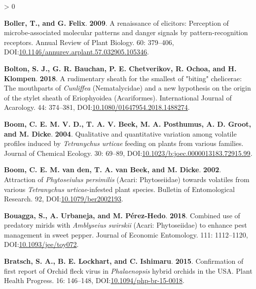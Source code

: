 \documentclass{ufdissertation}[overrideChapters] %
\newlength{\cslhangindent}
\newenvironment{CSLReferences}[2] %
 {%
  \setlength{\parindent}{0pt}
  \ifodd #1 \everypar{\setlength{\hangindent}{\cslhangindent}}\ignorespaces\fi
  \ifnum #2 > 0
  \setlength{\parskip}{#2\baselineskip}
  \fi
 }%
 {}
\begin{document}
{\begin{CSLReferences}{1}{1}
\leavevmode{}%
\textbf{Boller, T., and G. Felix}. \textbf{2009}. A renaissance of elicitors: Perception of microbe-associated molecular patterns and danger signals by pattern-recognition receptors. Annual Review of Plant Biology. 60: 379--406, DOI:\href{https://doi.org/10.1146/annurev.arplant.57.032905.105346}{10.1146/annurev.arplant.57.032905.105346}.

\leavevmode{}%
\textbf{Bolton, S. J., G. R. Bauchan, P. E. Chetverikov, R. Ochoa, and H. Klompen}. \textbf{2018}. A rudimentary sheath for the smallest of "biting" chelicerae: The mouthparts of {\emph{Cunliffea}} ({Nematalycidae}) and a new hypothesis on the origin of the stylet sheath of {Eriophyoidea} ({Acariformes}). International Journal of Acarology. 44: 374--381, DOI:\href{https://doi.org/10.1080/01647954.2018.1488274}{10.1080/01647954.2018.1488274}.

\leavevmode{}%
\textbf{Boom, C. E. M. V. D., T. A. V. Beek, M. A. Posthumus, A. D. Groot, and M. Dicke}. \textbf{2004}. Qualitative and quantitative variation among volatile profiles induced by {\emph{Tetranychus urticae}} feeding on plants from various families. Journal of Chemical Ecology. 30: 69--89, DOI:\href{https://doi.org/10.1023/b:joec.0000013183.72915.99}{10.1023/b:joec.0000013183.72915.99}.

\leavevmode{}%
\textbf{Boom, C. E. M. van den, T. A. van Beek, and M. Dicke}. \textbf{2002}. Attraction of {\emph{Phytoseiulus persimilis}} ({Acari}: {Phytoseiidae}) towards volatiles from various {\emph{Tetranychus urticae}}-infested plant species. Bulletin of Entomological Research. 92, DOI:\href{https://doi.org/10.1079/ber2002193}{10.1079/ber2002193}.

\leavevmode{}%
\textbf{Bouagga, S., A. Urbaneja, and M. Pérez-Hedo}. \textbf{2018}. Combined use of predatory mirids with {\emph{Amblyseius swirskii}} ({Acari}: {Phytoseiidae}) to enhance pest management in sweet pepper. Journal of Economic Entomology. 111: 1112--1120, DOI:\href{https://doi.org/10.1093/jee/toy072}{10.1093/jee/toy072}.

\leavevmode{}%
\textbf{Bratsch, S. A., B. E. Lockhart, and C. Ishimaru}. \textbf{2015}. Confirmation of first report of {Orchid fleck virus} in {\emph{Phalaenopsis}} hybrid orchids in the {USA}. Plant Health Progress. 16: 146--148, DOI:\href{https://doi.org/10.1094/php-br-15-0018}{10.1094/php-br-15-0018}.


\end{CSLReferences}}
\end{document}
